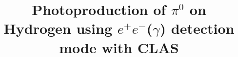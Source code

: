 \documentclass[aps,prc,twocolumn,floatfix,showpacs,preprintnumbers,amsmath,amssymb,superscriptaddress,linenumbers]{revtex4-1}
\def\epemT{$ e^+e^-  $}
\begin{document}
\preprint{}

\title{Photoproduction of $\pi^0$ on Hydrogen using \epemT($\gamma$) detection mode with CLAS}


\newcommand*{\ODU}{Old Dominion University, Norfolk, VA 23529, USA}
\newcommand*{\IKP}{Institut f\"ur Kernphysik, Forschungszentrum J\"ulich, 
	52424 J\"ulich, Germany}
\newcommand*{\BOCHUM}{Institut f\"ur Experimentalphysik I, Ruhr–Universit\"at 
	Bochum, 44780 Bochum, Germany}
\newcommand*{\JARA}{ JARA–FAME, J\"ulich Aachen Research Alliance, 
	Forschungszentrum J\"ulich, 52425 J\"ulich, and RWTH Aachen, 52056 
	Aachen, Germany}
\newcommand*{\KYUNGPOOK} {Kyungpook National University, 702-701, Daegu, 
	Republic of Korea}
\newcommand*{\INR}{Institute for Nuclear Research, 117312, Moscow, Russia}
\newcommand*{\CUA}{Catholic University of America, Washington, DC 20064} 
\newcommand*{\JLAB}{Thomas Jefferson National Accelerator Facility, Newport 
	News, VA 23606}
\newcommand*{\UVA}{University of Virginia, Charlottesville, VA 22904, USA}
\newcommand*{\CMU}{Carnegie Mellon University, Pittsburg, PA 15213, USA}
\end{document}
